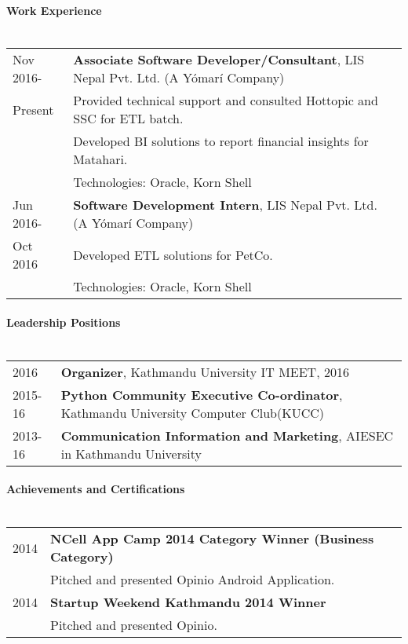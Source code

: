 \documentclass[letterpaper,10pt,oneside]{article}
\begin{document}
\paragraph{\large{Work Experience}\\\\}
\noindent \begin{tabular}{l l}
 Nov 2016-    & \textbf{Associate Software Developer/Consultant}, LIS Nepal Pvt. Ltd. (A Yómarí Company) \\
 Present      & Provided technical support and consulted Hottopic and SSC for ETL batch. \\
              & Developed BI solutions to report financial insights for Matahari. \\
              & Technologies: Oracle, Korn Shell\\
 Jun 2016-    & \textbf{Software Development Intern}, LIS Nepal Pvt. Ltd. (A Yómarí Company) \\
 Oct 2016     & Developed ETL solutions for PetCo. \\
              & Technologies: Oracle, Korn Shell\\
\end{tabular}

\paragraph{\large{Leadership Positions}\\\\}
\noindent \begin{tabular}{l l}
 2016       & \textbf{Organizer}, Kathmandu University IT MEET, 2016 \\
 2015-16    & \textbf{Python Community Executive Co-ordinator}, Kathmandu University Computer Club(KUCC) \\
 2013-16    & \textbf{Communication Information and Marketing}, AIESEC in Kathmandu University \\
\end{tabular}


\paragraph{\large{Achievements and Certifications}\\\\}
\noindent \begin{tabular}{l l}
 2014    & \textbf{NCell App Camp 2014 Category Winner (Business Category)} \\
         & Pitched and presented Opinio Android Application. \\
 2014    & \textbf{Startup Weekend Kathmandu 2014 Winner} \\
         & Pitched and presented Opinio. \\
\end{tabular}
\end{document}
